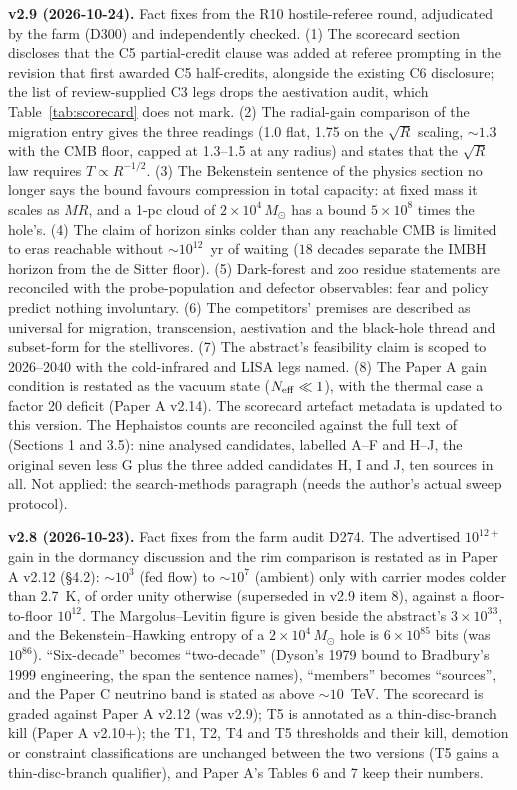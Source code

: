 \documentclass[11pt]{article}
\newcommand{\msun}{\ensuremath{M_\odot}}
\begin{document}
\textbf{v2.9 (2026-10-24).} Fact fixes from the R10 hostile-referee round, adjudicated by the farm (D300) and independently checked. (1) The scorecard section discloses that the C5 partial-credit clause was added at referee prompting in the revision that first awarded C5 half-credits, alongside the existing C6 disclosure; the list of review-supplied C3 legs drops the aestivation audit, which Table~\ref{tab:scorecard} does not mark. (2) The radial-gain comparison of the migration entry gives the three readings (1.0 flat, 1.75 on the $\sqrt{R}$ scaling, $\sim1.3$ with the CMB floor, capped at 1.3--1.5 at any radius) and states that the $\sqrt{R}$ law requires $T\propto R^{-1/2}$. (3) The Bekenstein sentence of the physics section no longer says the bound favours compression in total capacity: at fixed mass it scales as $MR$, and a 1-pc cloud of $2\times10^{4}\,\msun$ has a bound $5\times10^{8}$ times the hole's. (4) The claim of horizon sinks colder than any reachable CMB is limited to eras reachable without $\sim10^{12}$~yr of waiting ($18$ decades separate the IMBH horizon from the de Sitter floor). (5) Dark-forest and zoo residue statements are reconciled with the probe-population and defector observables: fear and policy predict nothing involuntary. (6) The competitors' premises are described as universal for migration, transcension, aestivation and the black-hole thread and subset-form for the stellivores. (7) The abstract's feasibility claim is scoped to 2026--2040 with the cold-infrared and LISA legs named. (8) The Paper A gain condition is restated as the vacuum state ($N_{\rm eff}\ll1$), with the thermal case a factor 20 deficit (Paper A v2.14). The scorecard artefact metadata is updated to this version. The Hephaistos counts are reconciled against the full text of \citet{Ren2026Diagnostics} (Sections 1 and 3.5): nine analysed candidates, labelled A--F and H--J, the original seven less G plus the three added candidates H, I and J, ten sources in all. Not applied: the search-methods paragraph (needs the author's actual sweep protocol).

\textbf{v2.8 (2026-10-23).} Fact fixes from the farm audit D274. The advertised $10^{12+}$ gain in the dormancy discussion and the rim comparison is restated as in Paper A v2.12 (\S4.2): $\sim 10^{3}$ (fed flow) to $\sim 10^{7}$ (ambient) only with carrier modes colder than 2.7~K, of order unity otherwise (superseded in v2.9 item 8), against a floor-to-floor $10^{12}$. The Margolus--Levitin figure is given beside the abstract's $3\times10^{33}$, and the Bekenstein--Hawking entropy of a $2\times10^{4}\,\msun$ hole is $6\times10^{85}$ bits (was $10^{86}$). ``Six-decade'' becomes ``two-decade'' (Dyson's 1979 bound to Bradbury's 1999 engineering, the span the sentence names), ``members'' becomes ``sources'', and the Paper C neutrino band is stated as above $\sim 10$~TeV. The scorecard is graded against Paper A v2.12 (was v2.9); T5 is annotated as a thin-disc-branch kill (Paper A v2.10+); the T1, T2, T4 and T5 thresholds and their kill, demotion or constraint classifications are unchanged between the two versions (T5 gains a thin-disc-branch qualifier), and Paper A's Tables 6 and 7 keep their numbers.
\end{document}
